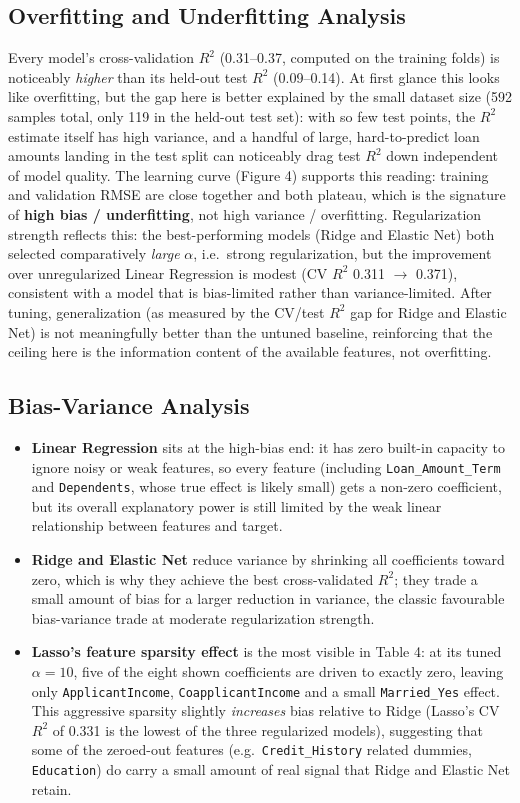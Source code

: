\documentclass[12pt,a4paper]{article}
\begin{document}
\subsection*{Overfitting and Underfitting Analysis}
Every model's cross-validation $R^2$ (0.31--0.37, computed on the training folds) is
noticeably \emph{higher} than its held-out test $R^2$ (0.09--0.14). At first glance this
looks like overfitting, but the gap here is better explained by the small dataset size
(592 samples total, only 119 in the held-out test set): with so few test points, the
$R^2$ estimate itself has high variance, and a handful of large, hard-to-predict loan
amounts landing in the test split can noticeably drag test $R^2$ down independent of
model quality. The learning curve (Figure 4) supports this reading: training and
validation RMSE are close together and both plateau, which is the signature of
\textbf{high bias / underfitting}, not high variance / overfitting. Regularization
strength reflects this: the best-performing models (Ridge and Elastic Net) both selected
comparatively \emph{large} $\alpha$, i.e.\ strong regularization, but the improvement
over unregularized Linear Regression is modest (CV $R^2$ 0.311 $\to$ 0.371), consistent
with a model that is bias-limited rather than variance-limited. After tuning,
generalization (as measured by the CV/test $R^2$ gap for Ridge and Elastic Net) is not
meaningfully better than the untuned baseline, reinforcing that the ceiling here is the
information content of the available features, not overfitting.

\subsection*{Bias-Variance Analysis}
\begin{itemize}
\item \textbf{Linear Regression} sits at the high-bias end: it has zero built-in
capacity to ignore noisy or weak features, so every feature (including
\texttt{Loan\_Amount\_Term} and \texttt{Dependents}, whose true effect is likely small)
gets a non-zero coefficient, but its overall explanatory power is still limited by the
weak linear relationship between features and target.
\item \textbf{Ridge and Elastic Net} reduce variance by shrinking all coefficients
toward zero, which is why they achieve the best cross-validated $R^2$; they trade a
small amount of bias for a larger reduction in variance, the classic favourable
bias-variance trade at moderate regularization strength.
\item \textbf{Lasso's feature sparsity effect} is the most visible in Table 4: at its
tuned $\alpha=10$, five of the eight shown coefficients are driven to exactly zero,
leaving only \texttt{ApplicantIncome}, \texttt{CoapplicantIncome} and a small
\texttt{Married\_Yes} effect. This aggressive sparsity slightly \emph{increases} bias
relative to Ridge (Lasso's CV $R^2$ of 0.331 is the lowest of the three regularized
models), suggesting that some of the zeroed-out features (e.g.\ \texttt{Credit\_History}
related dummies, \texttt{Education}) do carry a small amount of real signal that Ridge
and Elastic Net retain.
\end{itemize}
\end{document}
